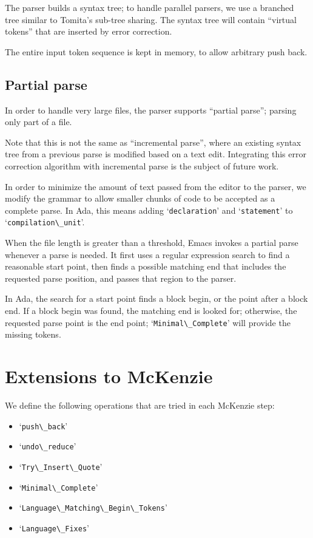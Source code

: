 \documentclass{article}
\newcommand{\code}[1]{`\lstinline|#1|'}
\begin{document}
The parser builds a syntax tree; to handle parallel parsers, we use a
branched tree similar to Tomita's sub-tree sharing. The syntax tree
will contain ``virtual tokens'' that are inserted by error correction.

The entire input token sequence is kept in memory, to allow arbitrary
push back.

\subsection{Partial parse}
In order to handle very large files, the parser supports ``partial
parse''; parsing only part of a file.

Note that this is not the same as ``incremental parse'', where an
existing syntax tree from a previous parse is modified based on a text
edit. Integrating this error correction algorithm with incremental
parse is the subject of future work.

In order to minimize the amount of text passed from the editor to the
parser, we modify the grammar to allow smaller chunks of code to be
accepted as a complete parse. In Ada, this means adding
\code{declaration} and \code{statement} to \code{compilation\_unit}.

When the file length is greater than a threshold, Emacs invokes a
partial parse whenever a parse is needed. It first uses a regular
expression search to find a reasonable start point, then finds a
possible matching end that includes the requested parse position, and
passes that region to the parser.

In Ada, the search for a start point finds a block begin, or the point
after a block end. If a block begin was found, the matching end is
looked for; otherwise, the requested parse point is the end point;
\code{Minimal\_Complete} will provide the missing tokens.

\section{Extensions to McKenzie}
We define the following operations that are tried in each McKenzie
step:
\begin{itemize}
\item \code{push\_back}
\item \code{undo\_reduce}
\item \code{Try\_Insert\_Quote}
\item \code{Minimal\_Complete}
\item \code{Language\_Matching\_Begin\_Tokens}
\item \code{Language\_Fixes}
\end{itemize}
\end{document}
